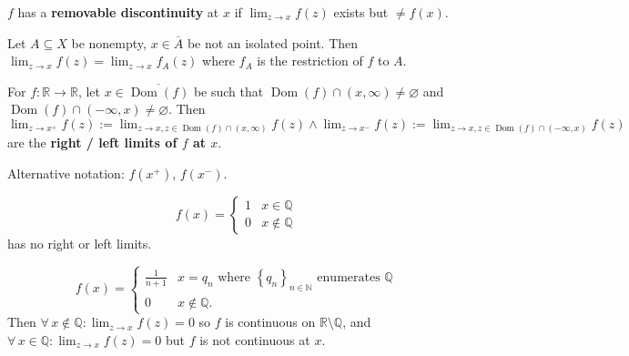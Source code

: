 \documentclass{notes}
\begin{document}
  \newpage

  \begin{defn}
    $f$ has a {\boldmath \bfseries removable discontinuity} at $x$ if $\lim_{z \to x} f(z)$ exists but $\neq f(x)$.
  \end{defn}
  
  \begin{defn}
    Let $A \subseteq X$ be nonempty, $x \in \overline A$ be not an isolated point.
    Then $\lim_{z \to x} f(z) = \lim_{z \to x} f_A(z)$ where $f_A$ is the restriction of $f$ to $A$.
  \end{defn}
  
  \begin{defn}
    For $f \colon \mathbb R \to \mathbb R$, let $x \in \overline{\operatorname{Dom}(f)}$ be such that $\operatorname{Dom}(f) \cap (x, \infty) \neq \varnothing$ and $\operatorname{Dom}(f) \cap (-\infty, x) \neq \varnothing$.
    Then $\lim_{z \to x^+} f(z) := \lim_{z \to x, z \in \operatorname{Dom}(f) \cap (x, \infty)} f(z) \land \lim_{z \to x^-} f(z) := \lim_{z \to x, z \in \operatorname{Dom}(f) \cap (-\infty, x)} f(z)$ are the {\boldmath \bfseries right / left limits of $f$ at $x$}.

    Alternative notation: $f(x^+)$, $f(x^-)$.
  \end{defn}
  
  \begin{eg}
    \begin{equation}
      f(x) = \begin{cases}
        1 & x \in \mathbb Q \\ 
        0 & x \not \in \mathbb Q
      \end{cases}
    \end{equation}
    has no right or left limits.
  \end{eg}
  
  \begin{eg}
    \begin{equation}
      f(x) = \begin{cases}
        \frac{1}{n + 1} & x = q_n \text{ where $\left \{ q_n \right \}_{n \in \mathbb N}$ enumerates $\mathbb Q$} \\ 
        0 & x \not \in \mathbb Q.
      \end{cases}
    \end{equation}
    Then $\forall \, x \not \in \mathbb Q: \lim_{z \to x} f(z) = 0$ so $f$ is continuous on $\mathbb R \setminus \mathbb Q$, and $\forall \, x \in \mathbb Q: \lim_{z \to x} f(z) = 0$ but $f$ is not continuous at $x$.
  \end{eg}
  
\end{document}
